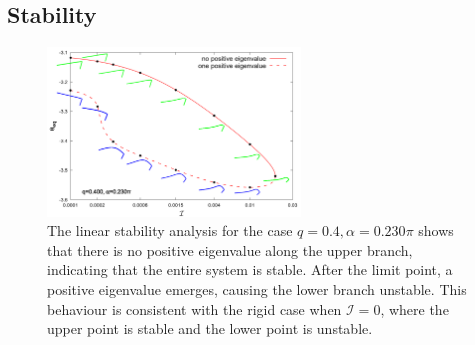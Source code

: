 \documentclass[a4paper,12pt]{report}
\begin{document}
\subsection{Stability}
\begin{figure}[!h]
	\begin{center}
		\includegraphics[width=0.6\textwidth]{plot/solid_dash_combine_elastic_beam_I_theta_q_0.40_alpha_0.230pi_initial_-4.80_0.png}
		\caption{The linear stability analysis for the case $q=0.4,\alpha=0.230\pi$ shows that there is no positive eigenvalue along the upper branch, indicating that the entire system is stable. After the limit point, a positive eigenvalue emerges, causing the lower branch unstable. This behaviour is consistent with the rigid case when $\mathcal{I}=0$, where the upper point is stable and the lower point is unstable.}
		\label{fig:10}
	\end{center}
\end{figure}
\end{document}
